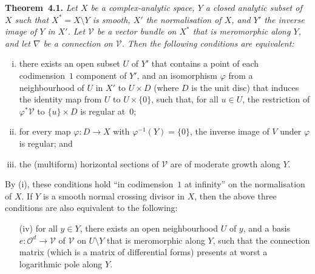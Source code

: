 \documentclass{report}
\newenvironment{itenv}[1]
  {\phantomsection\par\medskip\noindent\textbf{#1.}\itshape}
  {\par\medskip}
\renewcommand{\cal}[1]{{\mathcal{#1}}}
\newcommand{\oldpage}[1]{\marginpar{\footnotesize$\Big\vert$ \textit{p.~#1}}}
\begin{document}
\begin{itenv}{Theorem~4.1}
\label{II.4.1}
  Let $X$ be a complex-analytic space, $Y$ a closed analytic subset of $X$ such that $X^*=X\setminus Y$ is smooth, $X'$ the normalisation of $X$, and $Y'$ the inverse image of $Y$ in $X'$.
  Let $\cal{V}$ be a vector bundle on $X^*$ that is meromorphic along $Y$, and let $\nabla$ be a connection on $\cal{V}$.
  Then the following conditions are equivalent:
  \begin{enumerate}[(i)]
    \item there exists an open subset $U$ of $Y'$ that contains a point of each codimension~$1$ component of $Y'$, and an isomorphism $\varphi$ from a neighbourhood of $U$ in $X'$ to $U\times D$ (where $D$ is the unit disc) that induces the identity map from $U$ to $U\times\{0\}$, such that, for all $u\in U$, the restriction of $\varphi^*\cal{V}$ to $\{u\}\times D$ is regular at~$0$;
\oldpage{86}
    \item for every map $\varphi\colon D\to X$ with $\varphi^{-1}(Y)=\{0\}$, the inverse image of $V$ under $\varphi$ is regular; and
    \item the (multiform) horizontal sections of $\cal{V}$ are of moderate growth along $Y$.
  \end{enumerate}

  By (i), these conditions hold ``in codimension~$1$ at infinity'' on the normalisation of $X$.
  If $Y$ is a smooth normal crossing divisor in $X$, then the above three conditions are also equivalent to the following:
  \begin{enumerate}
    \item[(iv)] for all $y\in Y$, there exists an open neighbourhood $U$ of $y$, and a basis $e\colon\cal{O}^d\to\cal{V}$ of $\cal{V}$ on $U\setminus Y$ that is meromorphic along $Y$, such that the connection matrix (which is a matrix of differential forms) presents at worst a logarithmic pole along $Y$.
  \end{enumerate}
\end{itenv}
\end{document}
